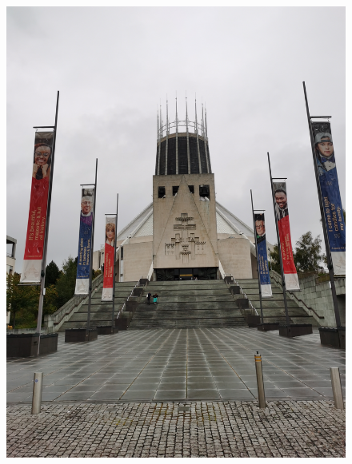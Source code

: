 \documentclass[11pt]{article}
\begin{document}
\begin{figure}[H]
    \centering
    \includegraphics[width=\textwidth]{1F.jpg}
\end{figure}
\end{document}
